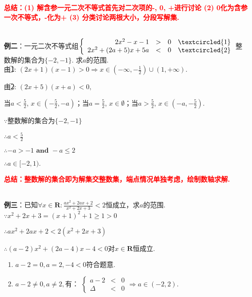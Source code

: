 \documentclass[8pt]{article}
\begin{document}
					\textcolor{red}{\textbf{总结：(1) 解含参一元二次不等式首先对二次项的-, 0, +进行讨论 (2) 0化为含参一次不等式，-化为+ (3) 分类讨论两根大小，分段写解集.}}

				~\\

				\textbf{例二}：一元二次不等式组$\displaystyle\left\{\begin{array}{rclc}2x^2-x-1&>&0&\textcircled{1}\\2x^2+(2a+5)x+5a&<&0&\textcircled{2}\end{array}\right.$整数解的集合为$\{-2, -1\}$. 求$a$的范围.
					~\\

					由\textcircled{1}: $(2x+1)(x-1)>0 \Rightarrow x\in\left(-\infty, -\frac{1}{2}\right)\cup(1, +\infty).$

					由\textcircled{2}: $(2x+5)(x+a)<0,$

					当$a<\frac{5}{2}$, $x\in\left(-\frac{5}{2}, -a\right)$；当$a=\frac{5}{2}$, $x\in\emptyset$；当$a>\frac{5}{2}$, $x\in\left(-a, -\frac{5}{2}\right)$.

					$\because$整数解的集合为$\{-2, -1\}$

					$\therefore a<\frac{5}{2}$

					$\therefore -a>-1 \textbf{ and } -a \leq 2$

					$\therefore a\in [-2, 1).$

					\textcolor{red}{\textbf{总结：整数解的集合即为解集交整数集，端点情况单独考虑，绘制数轴求解.}}

				~\\

				\textbf{例三}：已知$\forall x \in \mathbf{R}: \displaystyle \frac{ax^2+2ax+2}{x^2+2x+3}<2$恒成立，求$a$的范围.
					~\\

					$\because x^2+2x+3=(x+1)^2+1\geq 1>0$

					$\therefore ax^2+2ax+2<2(x^2+2x+3)$

					$\therefore (a-2)x^2+(2a-4)x-4<0$对$x\in \mathbf{R}$恒成立.

					\begin{enumerate}[label=$\arabic*^{\circ}$]
						\item $a-2=0, a=2, -4<0$符合题意.
						\item $a-2\neq 0, a\neq 2, $有：
							$\displaystyle\left\{\begin{array}{rcl}a-2&<&0\\\Delta&<&0\end{array}\right.\Rightarrow a\in(-2, 2).$
					\end{enumerate}
\end{document}
